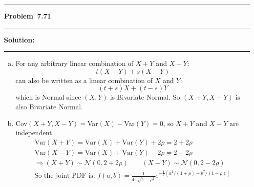 \documentclass[10.5pt]{article}
\newcommand\question[1]{\vspace{.2in}\hrule\vspace{0.04in}\textbf{Problem\ #1}\vspace{.4em}\hrule\vspace{.10in}}
\newcommand\Solution{\vspace{.3in}\textbf{Solution:}\vspace{.5em}\hrule\vspace{.08in}\par}
\begin{document}
\question{7.71}
\Solution{}
\begin{enumerate}[(a)]
	\item For any arbitrary linear combination of $X+Y$ and $X-Y$:$$t(X+Y)+s(X-Y)$$
	can also be written as a linear combination of $X$ and $Y$:$$(t+s)X+(t-s)Y$$
	which is Normal since $(X, Y)$ is Bivariate Normal. So $(X+Y, X-Y)$ is also Bivariate Normal.\vspace{1cm}
	\item Cov$(X+Y, X-Y)=$Var$(X)-$Var$(Y) = 0$, so $X+Y$ and $X-Y$ are independent.
	\begin{align*}
		\text{Var}(X+Y) = \text{Var}(X) + \text{Var}(Y) + 2\rho = 2+2\rho\\[6pt]
		\text{Var}(X-Y) = \text{Var}(X) + \text{Var}(Y) - 2\rho = 2-2\rho\\[6pt]
		\Rightarrow (X+Y)\sim\mathcal{N}(0, 2+2\rho)\qquad(X-Y)\sim\mathcal{N}(0, 2-2\rho)\\[6pt]
		\text{So the joint PDF is: } f(a, b)=\frac{1}{4\pi\sqrt{1-\rho^2}}e^{-\frac{1}{4}\left(a^2/(1+\rho)+b^2/(1-\rho)\right)}
	\end{align*}
\end{enumerate}

\pagebreak
\end{document}
